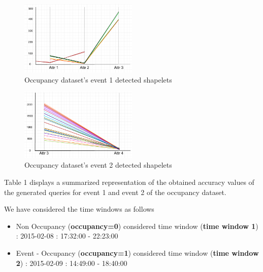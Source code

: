 \documentclass[letterpaper, 10 pt, conference]{IEEEtran}  %
\begin{document}
\begin{figure}[h!]
\includegraphics[width=0.5\textwidth]{Occupancy_event1.png}
\caption{Occupancy dataset's event 1 detected shapelets}
\end{figure}

\begin{figure}[h!]
\includegraphics[width=0.5\textwidth]{Occupancy_event2.png}
\caption{Occupancy dataset's event 2 detected shapelets}
\end{figure}

Table 1 displays a summarized representation of the obtained accuracy values of the generated queries for event 1 and event 2 of the occupancy dataset.

We have considered the time windows as follows
\begin{itemize}
\item Non Occupancy (\textbf{occupancy=0}) considered time window (\textbf{time window 1}) : 2015-02-08 : 17:32:00 - 22:23:00
\item Event - Occupancy (\textbf{occupancy=1}) considered time window (\textbf{time window 2}) : 2015-02-09 : 14:49:00 - 18:40:00
\end{itemize}
\end{document}
